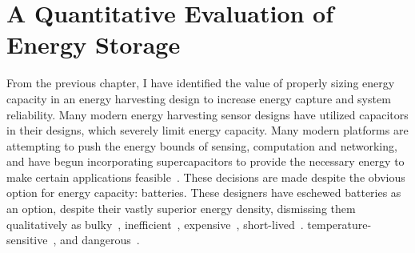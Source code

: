 \chapter{A Quantitative Evaluation of Energy Storage}
\label{chap:battery}

From the previous chapter, I have identified the value of properly sizing energy capacity in an energy harvesting design to increase energy capture and system reliability. 
Many modern energy harvesting sensor designs have utilized capacitors in their designs, which severely limit energy capacity.
Many modern platforms are attempting to push the energy bounds of sensing, computation and networking, and have begun incorporating supercapacitors to provide the necessary energy to make certain applications feasible~\cite{nardello2019camaroptera}.
These decisions are made despite the obvious option for energy capacity: batteries.
These designers have eschewed batteries as an option, despite their vastly superior energy density, dismissing them qualitatively as 
bulky~\cite{hesterNew17, hesterTragedy15, hesterFlicker17, hesterTimely17, yervaGrafting12},
inefficient~\cite{hesterNew17, hesterTragedy15, hesterFlicker17, hesterTimely17},
expensive~\cite{hesterNew17, hesterTragedy15, hesterFlicker17, hesterTimely17},
short-lived~\cite{hesterNew17, hesterTragedy15, hesterFlicker17, hesterTimely17, colinReconfigurable18, luciaIntermittent17, yervaGrafting12}.
temperature-sensitive~\cite{hesterNew17, hesterTragedy15, hesterFlicker17, hesterTimely17, colinReconfigurable18, luciaIntermittent17},
and dangerous~\cite{hesterNew17, hesterTragedy15, hesterFlicker17, hesterTimely17}. 

